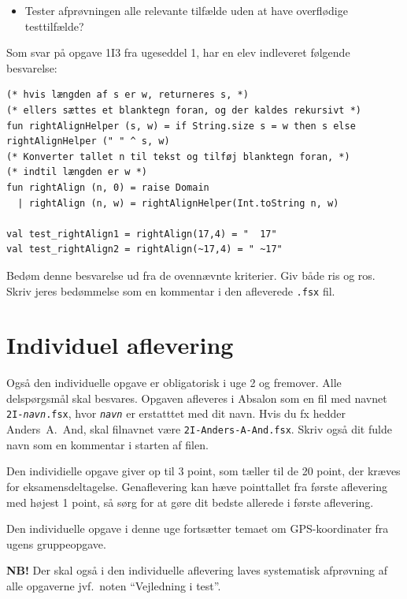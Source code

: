 \documentclass[a4paper,12pt]{article}
\begin{document}
\begin{enumerate}[{2}G1]
\begin{itemize}
\item Tester afprøvningen alle relevante tilfælde uden at have
  overflødige testtilfælde?
\end{itemize}

Som svar på opgave 1I3 fra ugeseddel 1, har en elev indleveret
følgende besvarelse:
{\footnotesize
\begin{Verbatim}
(* hvis længden af s er w, returneres s, *)
(* ellers sættes et blanktegn foran, og der kaldes rekursivt *)
fun rightAlignHelper (s, w) = if String.size s = w then s else rightAlignHelper (" " ^ s, w)
(* Konverter tallet n til tekst og tilføj blanktegn foran, *)
(* indtil længden er w *)
fun rightAlign (n, 0) = raise Domain
  | rightAlign (n, w) = rightAlignHelper(Int.toString n, w)

val test_rightAlign1 = rightAlign(17,4) = "  17"
val test_rightAlign2 = rightAlign(~17,4) = " ~17"
\end{Verbatim}
}

Bedøm denne besvarelse ud fra de ovennævnte kriterier.  Giv både ris
og ros.  Skriv jeres bedømmelse som en kommentar i den afleverede
\verb|.fsx| fil.

\end{enumerate}

\section{Individuel aflevering}
\label{sec:indiv-aflev}

Også den individuelle opgave er obligatorisk i uge 2 og fremover.
Alle delspørgsmål skal besvares.  Opgaven afleveres i Absalon som en
fil med navnet \texttt{2I-\textit{navn}.fsx}, hvor
\texttt{\textit{navn}} er erstatttet med dit navn. Hvis du fx hedder
Anders~A.~And, skal filnavnet være \texttt{2I-Anders-A-And.fsx}. Skriv
også dit fulde navn som en kommentar i starten af filen.

Den individielle opgave giver op til 3 point, som tæller til de 20
point, der kræves for eksamensdeltagelse.  Genaflevering kan hæve
pointtallet fra første aflevering med højest 1 point, så sørg for at
gøre dit bedste allerede i første aflevering.

Den individuelle opgave i denne uge fortsætter temaet om
GPS-koordinater fra ugens gruppeopgave.

\textbf{NB!} Der skal også i den individuelle aflevering laves
systematisk afprøvning af alle opgaverne jvf.\ noten ``Vejledning i
test''.
\end{document}
